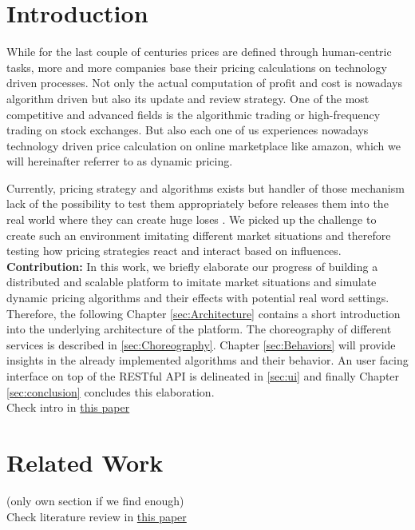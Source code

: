 \section{Introduction}
%
While for the last couple of centuries prices are defined through human-centric tasks, more and more companies base their pricing calculations on technology driven processes. Not only the actual computation of profit and cost is nowadays algorithm driven but also its update and review strategy.
One of the most competitive and advanced fields is the algorithmic trading or high-frequency trading on stock exchanges. But also each one of us experiences nowadays technology driven price calculation on online marketplace like amazon, which we will hereinafter referrer to as dynamic pricing. 

Currently, pricing strategy and algorithms exists but handler of those mechanism lack of the possibility to test them appropriately before releases them into the real world where they can create huge loses \citep{uflacker2016ertragsmanagement} \citep{schlosser2016optimal} \citep{schlosser2016stochastic} \citep{schlosser2016survive}. We picked up the challenge to create such an environment imitating different market situations and therefore testing how pricing strategies react and interact based on influences.\\

\textbf{Contribution:} In this work, we briefly elaborate our progress of building a distributed and scalable platform to imitate market situations and simulate dynamic pricing algorithms and their effects with potential real word settings.
Therefore, the following Chapter \ref{sec:Architecture} contains a short introduction into the underlying architecture of the platform.
The choreography of different services is described in \ref{sec:Choreography}. Chapter \ref{sec:Behaviors} will provide insights in the already implemented algorithms and their behavior.
An user facing interface on top of the RESTful API is delineated in \ref{sec:ui} and finally Chapter \ref{sec:conclusion} concludes this elaboration. \\

Check intro in \href{http://faculty.chicagobooth.edu/workshops/omscience/pdf/Spring%202016/Popescu.pdf}{this paper}

\section{Related Work}
(only own section if we find enough) \\

Check literature review in \href{http://faculty.chicagobooth.edu/workshops/omscience/pdf/Spring%202016/Popescu.pdf}{this paper}